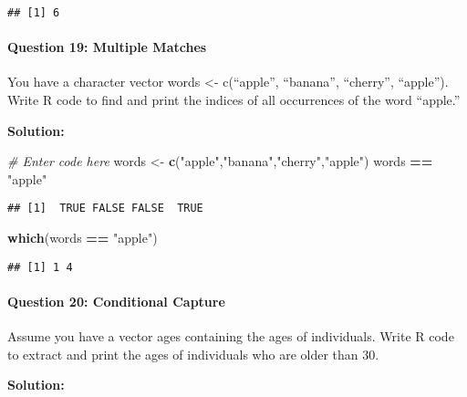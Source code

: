 \documentclass[
]{article}
\newenvironment{Shaded}{\begin{snugshade}}{\end{snugshade}}
\newcommand{\CommentTok}[1]{\textcolor[rgb]{0.56,0.35,0.01}{\textit{#1}}}
\newcommand{\FunctionTok}[1]{\textcolor[rgb]{0.13,0.29,0.53}{\textbf{#1}}}
\newcommand{\NormalTok}[1]{#1}
\newcommand{\OtherTok}[1]{\textcolor[rgb]{0.56,0.35,0.01}{#1}}
\newcommand{\SpecialCharTok}[1]{\textcolor[rgb]{0.81,0.36,0.00}{\textbf{#1}}}
\newcommand{\StringTok}[1]{\textcolor[rgb]{0.31,0.60,0.02}{#1}}
\begin{document}
\begin{verbatim}
## [1] 6
\end{verbatim}

\hypertarget{question-19-multiple-matches}{%
\paragraph{Question 19: Multiple
Matches}\label{question-19-multiple-matches}}

You have a character vector words \textless- c(``apple'', ``banana'',
``cherry'', ``apple''). Write R code to find and print the indices of
all occurrences of the word ``apple.''

\textbf{Solution:}

\begin{Shaded}
\begin{Highlighting}[]
\CommentTok{\# Enter code here}
\NormalTok{words }\OtherTok{\textless{}{-}} \FunctionTok{c}\NormalTok{(}\StringTok{"apple"}\NormalTok{,}\StringTok{"banana"}\NormalTok{,}\StringTok{"cherry"}\NormalTok{,}\StringTok{"apple"}\NormalTok{)}
\NormalTok{words }\SpecialCharTok{==} \StringTok{"apple"}
\end{Highlighting}
\end{Shaded}

\begin{verbatim}
## [1]  TRUE FALSE FALSE  TRUE
\end{verbatim}

\begin{Shaded}
\begin{Highlighting}[]
\FunctionTok{which}\NormalTok{(words }\SpecialCharTok{==} \StringTok{"apple"}\NormalTok{)}
\end{Highlighting}
\end{Shaded}

\begin{verbatim}
## [1] 1 4
\end{verbatim}

\hypertarget{question-20-conditional-capture}{%
\paragraph{Question 20: Conditional
Capture}\label{question-20-conditional-capture}}

Assume you have a vector ages containing the ages of individuals. Write
R code to extract and print the ages of individuals who are older than
30.

\textbf{Solution:}
\end{document}
